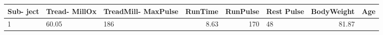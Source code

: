 \documentclass[]{book}
\begin{document}
\begin{longtable}[]{@{}lllrrlrr@{}}
\toprule
\begin{minipage}[b]{0.07\columnwidth}\raggedright\strut
Sub- ject\strut
\end{minipage} & \begin{minipage}[b]{0.10\columnwidth}\raggedright\strut
Tread- MillOx\strut
\end{minipage} & \begin{minipage}[b]{0.14\columnwidth}\raggedright\strut
TreadMill- MaxPulse\strut
\end{minipage} & \begin{minipage}[b]{0.09\columnwidth}\raggedleft\strut
RunTime\strut
\end{minipage} & \begin{minipage}[b]{0.10\columnwidth}\raggedleft\strut
RunPulse\strut
\end{minipage} & \begin{minipage}[b]{0.08\columnwidth}\raggedright\strut
Rest Pulse\strut
\end{minipage} & \begin{minipage}[b]{0.15\columnwidth}\raggedleft\strut
BodyWeight\strut
\end{minipage} & \begin{minipage}[b]{0.04\columnwidth}\raggedleft\strut
Age\strut
\end{minipage}\tabularnewline
\midrule
\endhead
\begin{minipage}[t]{0.07\columnwidth}\raggedright\strut
1\strut
\end{minipage} & \begin{minipage}[t]{0.10\columnwidth}\raggedright\strut
60.05\strut
\end{minipage} & \begin{minipage}[t]{0.14\columnwidth}\raggedright\strut
186\strut
\end{minipage} & \begin{minipage}[t]{0.09\columnwidth}\raggedleft\strut
8.63\strut
\end{minipage} & \begin{minipage}[t]{0.10\columnwidth}\raggedleft\strut
170\strut
\end{minipage} & \begin{minipage}[t]{0.08\columnwidth}\raggedright\strut
48\strut
\end{minipage} & \begin{minipage}[t]{0.15\columnwidth}\raggedleft\strut
81.87\strut
\end{minipage} & \begin{minipage}[t]{0.04\columnwidth}\raggedleft\strut

\end{minipage}
\end{longtable}
\end{document}
